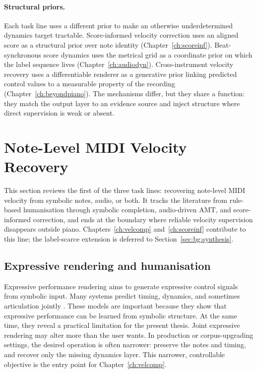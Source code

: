 \paragraph{Structural priors.}
Each task line uses a different prior to make an otherwise underdetermined dynamics target tractable. Score-informed velocity correction uses an aligned score as a structural prior over note identity (Chapter~\ref{ch:scoreinf}). Beat-synchronous score dynamics uses the metrical grid as a coordinate prior on which the label sequence lives (Chapter~\ref{ch:audiodyn}). Cross-instrument velocity recovery uses a differentiable renderer as a generative prior linking predicted control values to a measurable property of the recording (Chapter~\ref{ch:beyondpiano}). The mechanisms differ, but they share a function: they match the output layer to an evidence source and inject structure where direct supervision is weak or absent.

\section{Note-Level MIDI Velocity Recovery}
\label{sec:bg:velocity}

This section reviews the first of the three task lines: recovering note-level MIDI velocity from symbolic notes, audio, or both. It tracks the literature from rule-based humanisation through symbolic completion, audio-driven AMT, and score-informed correction, and ends at the boundary where reliable velocity supervision disappears outside piano. Chapters~\ref{ch:velcomp} and~\ref{ch:scoreinf} contribute to this line; the label-scarce extension is deferred to Section~\ref{sec:bg:synthesis}.

\subsection{Expressive rendering and humanisation}
\label{sec:bg:velocity:rendering}

Expressive performance rendering aims to generate expressive control signals from symbolic input. Many systems predict timing, dynamics, and sometimes articulation jointly \cite{jeong2019virtuosonet,borovik2023scoreperformer}. These models are important because they show that expressive performance can be learned from symbolic structure. At the same time, they reveal a practical limitation for the present thesis. Joint expressive rendering may alter more than the user wants. In production or corpus-upgrading settings, the desired operation is often narrower: preserve the notes and timing, and recover only the missing dynamics layer. This narrower, controllable objective is the entry point for Chapter~\ref{ch:velcomp}.

